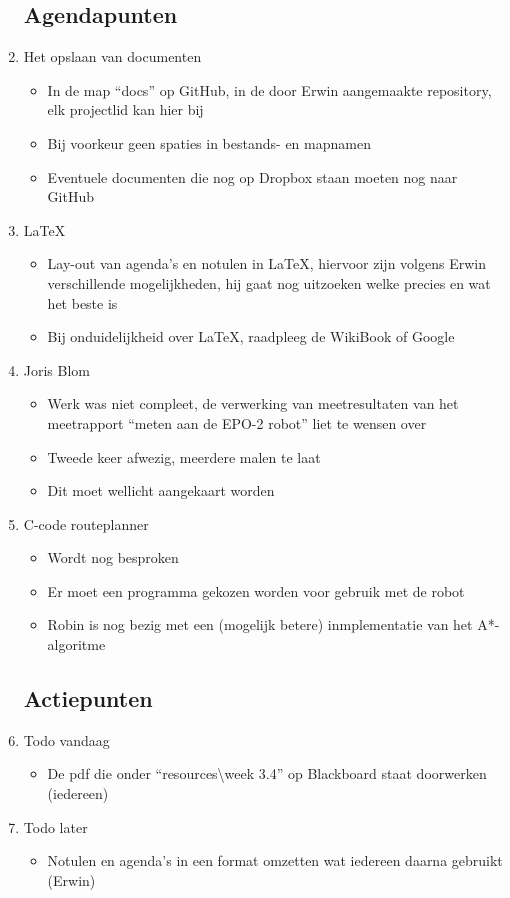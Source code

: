 \documentclass{article}
\begin{document}
\begin{enumerate}
	\subsection*{Agendapunten}
	\item Het opslaan van documenten
	\begin{itemize}
		\item In de map ``docs'' op GitHub, in de door Erwin aangemaakte repository, elk projectlid kan hier bij
		\item Bij voorkeur geen spaties in bestands- en mapnamen
		\item Eventuele documenten die nog op Dropbox staan moeten nog naar GitHub
	\end{itemize}
	\item LaTeX
	\begin{itemize}
		\item Lay-out van agenda's en notulen in LaTeX, hiervoor zijn volgens Erwin verschillende mogelijkheden, hij gaat nog uitzoeken welke precies en wat het beste is
		\item Bij onduidelijkheid over LaTeX, raadpleeg de WikiBook of Google
	\end{itemize}
	\item Joris Blom
	\begin{itemize}
		\item Werk was niet compleet, de verwerking van meetresultaten van het meetrapport ``meten aan de EPO-2 robot'' liet te wensen over
		\item Tweede keer afwezig, meerdere malen te laat
		\item Dit moet wellicht aangekaart worden
	\end{itemize}
	\item C-code routeplanner
	\begin{itemize}
		\item Wordt nog besproken
		\item Er moet een programma gekozen worden voor gebruik met de robot
		\item Robin is nog bezig met een (mogelijk betere) inmplementatie van het A*-algoritme
	\end{itemize}

	\subsection*{Actiepunten}
	\item Todo vandaag
	\begin{itemize}
		\item De pdf die onder ``resources\textbackslash week 3.4'' op Blackboard staat doorwerken (iedereen)
	\end{itemize}
	\item Todo later
	\begin{itemize}
		\item Notulen en agenda's in een format omzetten wat iedereen daarna gebruikt (Erwin)
	\end{itemize}


\end{enumerate}
\end{document}
